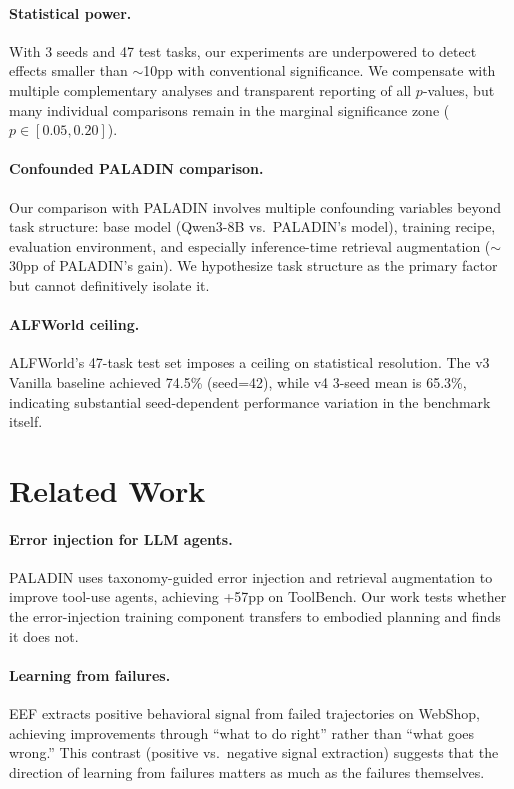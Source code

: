 \documentclass[11pt,a4paper]{article}
\begin{document}
\paragraph{Statistical power.} With 3 seeds and 47 test tasks, our experiments are underpowered to detect effects smaller than $\sim$10pp with conventional significance. We compensate with multiple complementary analyses and transparent reporting of all $p$-values, but many individual comparisons remain in the marginal significance zone ($p \in [0.05, 0.20]$).

\paragraph{Confounded PALADIN comparison.} Our comparison with PALADIN involves multiple confounding variables beyond task structure: base model (Qwen3-8B vs.\ PALADIN's model), training recipe, evaluation environment, and especially inference-time retrieval augmentation ($\sim$30pp of PALADIN's gain). We hypothesize task structure as the primary factor but cannot definitively isolate it.

\paragraph{ALFWorld ceiling.} ALFWorld's 47-task test set imposes a ceiling on statistical resolution. The v3 Vanilla baseline achieved 74.5\% (seed=42), while v4 3-seed mean is 65.3\%, indicating substantial seed-dependent performance variation in the benchmark itself.

\section{Related Work}
\label{sec:related}

\paragraph{Error injection for LLM agents.} PALADIN \citep{paladin2025} uses taxonomy-guided error injection and retrieval augmentation to improve tool-use agents, achieving +57pp on ToolBench. Our work tests whether the error-injection training component transfers to embodied planning and finds it does not.

\paragraph{Learning from failures.} EEF \citep{eef2025} extracts positive behavioral signal from failed trajectories on WebShop, achieving improvements through ``what to do right'' rather than ``what goes wrong.'' This contrast (positive vs.\ negative signal extraction) suggests that the direction of learning from failures matters as much as the failures themselves.
\end{document}
